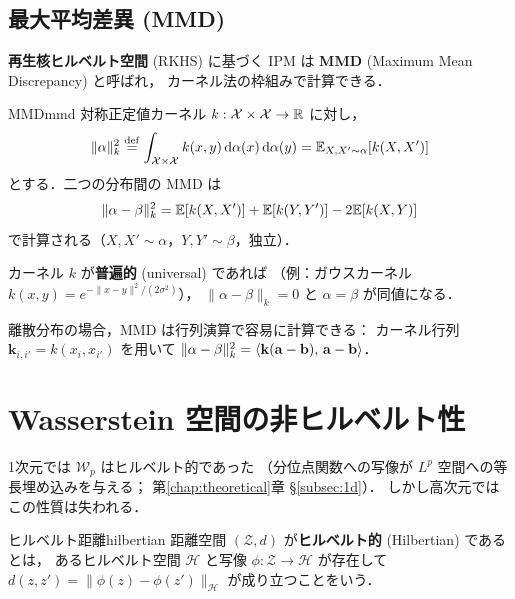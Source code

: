 \subsection{最大平均差異 (MMD)}\label{subsec:mmd}

\textbf{再生核ヒルベルト空間} (RKHS) に基づく IPM は
\textbf{MMD} (Maximum Mean Discrepancy) と呼ばれ，
カーネル法の枠組みで計算できる．

\begin{definition}{MMD}{mmd}
対称正定値カーネル $k : \mathcal{X} \times \mathcal{X} \to \mathbb{R}$ に対し，
\begin{equation}\label{eq:mmd}
  \|\alpha\|_k^2 \overset{\mathrm{def}}{=}
  \int_{\mathcal{X} \times \mathcal{X}} k(x, y)\,
  \mathrm{d}\alpha(x)\, \mathrm{d}\alpha(y)
  = \mathbb{E}_{X, X' \sim \alpha}[k(X, X')]
\end{equation}
とする．二つの分布間の MMD は
\begin{equation}\label{eq:mmd-distance}
  \|\alpha - \beta\|_k^2
  = \mathbb{E}[k(X,X')] + \mathbb{E}[k(Y,Y')] - 2\mathbb{E}[k(X,Y)]
\end{equation}
で計算される（$X, X' \sim \alpha$，$Y, Y' \sim \beta$，独立）．
\end{definition}

カーネル $k$ が\textbf{普遍的} (universal) であれば
（例：ガウスカーネル $k(x,y) = e^{-\|x-y\|^2/(2\sigma^2)}$），
$\|\alpha - \beta\|_k = 0$ と $\alpha = \beta$ が同値になる．

離散分布の場合，MMD は行列演算で容易に計算できる：
カーネル行列 $\mathbf{k}_{i,i'} = k(x_i, x_{i'})$ を用いて
$\|\alpha - \beta\|_k^2 = \langle \mathbf{k}(\mathbf{a} - \mathbf{b}),\, \mathbf{a} - \mathbf{b} \rangle$．


\section{Wasserstein 空間の非ヒルベルト性}\label{sec:not-hilbertian}

1次元では $\mathcal{W}_p$ はヒルベルト的であった
（分位点関数への写像が $L^p$ 空間への等長埋め込みを与える；
第\ref{chap:theoretical}章 §\ref{subsec:1d}）．
しかし高次元ではこの性質は失われる．

\begin{definition}{ヒルベルト距離}{hilbertian}
距離空間 $(\mathcal{Z}, d)$ が\textbf{ヒルベルト的} (Hilbertian) であるとは，
あるヒルベルト空間 $\mathcal{H}$ と写像
$\phi : \mathcal{Z} \to \mathcal{H}$ が存在して
$d(z, z') = \|\phi(z) - \phi(z')\|_{\mathcal{H}}$
が成り立つことをいう．
\end{definition}

